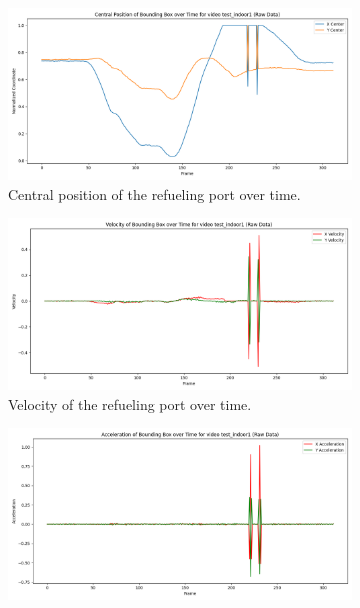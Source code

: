 \documentclass[12pt,oneside]{book} %
\begin{document}
\begin{figure}[H]
    \centering
    \begin{subfigure}[t]{0.6\textwidth}
        \includegraphics[width=\textwidth]{figures/bbox_metrics/test_indoor1 (Raw Data)_central_position.png}
        \caption{Central position of the refueling port over time.}
        \label{fig:central-position-test-indoor1}
    \end{subfigure}
    \hfill
    \begin{subfigure}[t]{0.6\textwidth}
        \includegraphics[width=\textwidth]{figures/bbox_metrics/test_indoor1 (Raw Data)_velocity.png}
        \caption{Velocity of the refueling port over time.}
        \label{fig:velocity-test-indoor1}
    \end{subfigure}
    \vfill
    \begin{subfigure}[t]{0.6\textwidth}
        \includegraphics[width=\textwidth]{figures/bbox_metrics/test_indoor1 (Raw Data)_acceleration.png}

\end{subfigure}
\end{figure}
\end{document}
